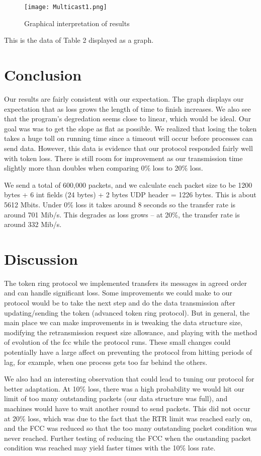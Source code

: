 \documentclass[12pt,journal,compsoc]{IEEEtran}
\begin{document}
\begin{figure}[h]
\texttt{[image: Multicast1.png]}
\caption{Graphical interpretation of results}
\end{figure}
This is the data of Table 2 displayed as a graph.

\section{Conclusion}
Our results are fairly consistent with our expectation. The graph displays our expectation that as loss grows the length of time to finish increases.  We also see that the program's degredation seems close to linear, which would be ideal. Our goal was was to get the slope as flat as possible. We realized that losing the token takes a huge toll on running time since a timeout will occur before processes can send data. However, this data is evidence that our protocol responded fairly well with token loss. There is still room for improvement as our transmission time slightly more than doubles when comparing 0\% loss to 20\% loss.

We send a total of 600,000 packets, and we calculate each packet size to be 1200 bytes + 6 int fields (24 bytes) + 2 bytes UDP header = 1226 bytes.  This is about 5612 Mbits. Under 0\% loss it takes around 8 seconds so the transfer rate is around 701 Mib/s. This degrades as loss grows -- at 20\%, the transfer rate is around 332 Mib/s.

\section{Discussion}
The token ring protocol we implemented transfers its messages in agreed order and can handle significant loss. Some improvements we could make to our protocol would be to take the next step and do the data transmission after updating/sending the token (advanced token ring protocol). But in general, the main place we can make improvements in is tweaking the data structure size, modifying the retransmission request size allowance, and playing with the method of evolution of the fcc while the protocol runs. These small changes could potentially have a large affect on preventing the protocol from hitting periods of lag, for example, when one process gets too far behind the others.

We also had an interesting observation that could lead to tuning our protocol for better adaptation.  At 10\% loss, there was a high probability we would hit our limit of too many outstanding packets (our data structure was full), and machines would have to wait another round to send packets.  This did not occur at 20\% loss, which was due to the fact that the RTR limit was reached early on, and the FCC was reduced so that the too many outstanding packet condition was never reached.  Further testing of reducing the FCC when the oustanding packet condition was reached may yield faster times with the 10\% loss rate.  
\end{document}
